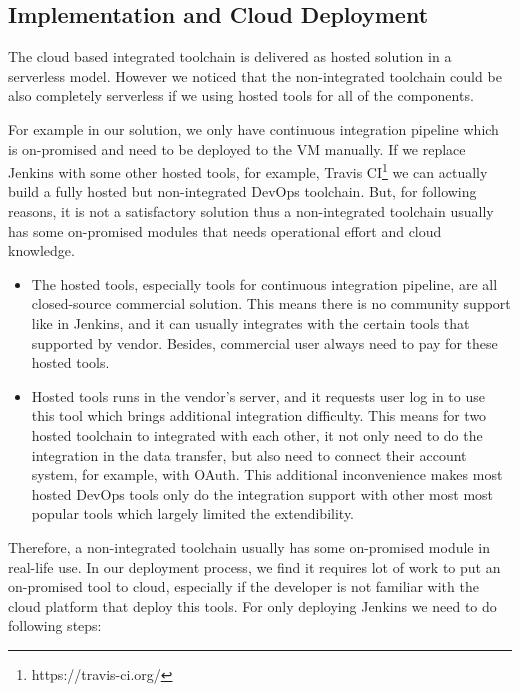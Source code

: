 \subsection{Implementation and Cloud Deployment}
The cloud based integrated toolchain is delivered as hosted solution in a serverless model. However we noticed that the non-integrated toolchain could be also completely serverless if we using hosted tools for all of the components. 
\par
For example in our solution, we only have continuous integration pipeline which is on-promised and need to be deployed to the VM manually. If we replace Jenkins with some other hosted tools, for example, Travis CI\footnote{https://travis-ci.org/} we can actually build a fully hosted but non-integrated DevOps toolchain. But, for following reasons, it is not a satisfactory solution thus a non-integrated toolchain usually has some on-promised modules that needs operational effort and cloud knowledge.
\begin{itemize}
    \item The hosted tools, especially tools for continuous integration pipeline, are all closed-source commercial solution. This means there is no community support like in Jenkins, and it can usually integrates with the certain tools that supported by vendor. Besides, commercial user always need to pay for these hosted tools.
    \item Hosted tools runs in the vendor's server, and it requests user log in to use this tool which brings additional integration difficulty. This means for two hosted toolchain to integrated with each other, it not only need to do the integration in the data transfer, but also need to connect their account system, for example, with OAuth. This additional inconvenience makes most hosted DevOps tools only do the integration support with other most most popular tools which largely limited the extendibility.
\end{itemize}
Therefore, a non-integrated toolchain usually has some on-promised module in real-life use. In our deployment process, we find it requires lot of work to put an on-promised tool to cloud, especially if the developer is not familiar with the cloud platform that deploy this tools. For only deploying Jenkins we need to do following steps:
